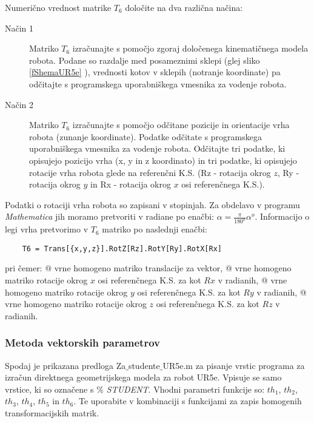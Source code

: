 Numerično vrednost matrike $T_6$ določite na dva različna načina:
\begin{description}
  \item[Način 1] Matriko $T_6$ izračunajte s pomočjo zgoraj določenega kinematičnega modela robota.
  Podane so razdalje med posameznimi sklepi (glej sliko \ref{fShemaUR5e} ), vrednosti kotov v sklepih (notranje koordinate)
  pa odčitajte s programskega uporabniškega vmesnika za vodenje robota.
  \item[Način 2] Matriko $T_6$ izračunajte s pomočjo odčitane pozicije in orientacije vrha robota (zunanje koordinate).
  Podatke odčitate s programskega uporabniškega vmesnika za vodenje robota. Odčitajte tri podatke, ki opisujejo pozicijo vrha (x, y in z koordinato)
    in tri podatke, ki opisujejo rotacije vrha robota glede na referenčni K.S. (Rz - rotacija okrog $z$, Ry - rotacija okrog $y$ in Rx - rotacija okrog $x$ osi referenčnega K.S.).
\end{description}

Podatki o rotaciji vrha robota so zapisani v stopinjah. Za obdelavo v programu
\emph{Mathematica} jih moramo pretvoriti v radiane po enačbi: $\alpha =
\frac{\pi}{180^o} \alpha^o$. Informacijo o legi vrha pretvorimo v $T_6$
matriko po naslednji enačbi:
\begin{verbatim}
    T6 = Trans[{x,y,z}].RotZ[Rz].RotY[Ry].RotX[Rx]
\end{verbatim}
pri čemer: \newline \verb@Trans[{x,y,z}]@ vrne homogeno matriko
translacije za vektor, \newline \verb@RotX[Rx]@ vrne homogeno matriko
rotacije okrog $x$ osi referenčnega K.S. za kot $Rx$ v radianih,
\newline \verb@RotY[Ry]@ vrne homogeno matriko rotacije okrog $y$ osi
referenčnega K.S. za kot $Ry$ v radianih,
\newline \verb@RotZ[Rz]@ vrne homogeno matriko rotacije okrog $z$ osi
referenčnega K.S. za kot $Rz$ v radianih.

\subsubsection{Metoda vektorskih parametrov}

Spodaj je prikazana predloga Za$\_$studente$\_$UR5e.m za pisanje
vrstic programa za izračun direktnega geometrijskega modela za robot
UR5e. Vpisuje se samo vrstice, ki so označene s \emph{$\%$
STUDENT}. Vhodni parametri funkcije so: $th_1$, $th_2$, $th_3$, $th_4$, $th_5$ in $th_6$. Te
uporabite v kombinaciji s funkcijami za zapis homogenih
transformacijskih matrik.

